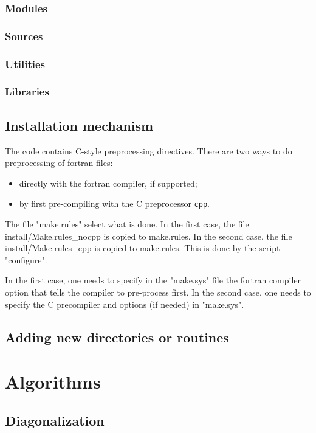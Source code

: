 \documentclass[12pt,a4paper]{article}
\begin{document}
\subsubsection{Modules}

\subsubsection{Sources}

\subsubsection{Utilities}

\subsubsection{Libraries}

\subsection{Installation mechanism}

The code contains C-style preprocessing directives. 
There are two ways to do preprocessing of fortran files:
\begin{itemize}
  \item directly with the fortran compiler, if supported;
  \item by first pre-compiling with the C preprocessor {\tt cpp}.
\end{itemize}
The file "make.rules" select what is done.
In the first case,  the file install/Make.rules\_nocpp is copied
to make.rules.
In the second case, the file install/Make.rules\_cpp is 
copied to make.rules. This is done by the script "configure".

In the first case, one needs to specify in the "make.sys" file the
fortran compiler option that tells the compiler 
to pre-process first. In the second case, one needs to 
specify the C precompiler and options (if needed) in "make.sys".

\subsection{Adding new directories or routines}

\section{Algorithms}

\subsection{Diagonalization}
\end{document}
